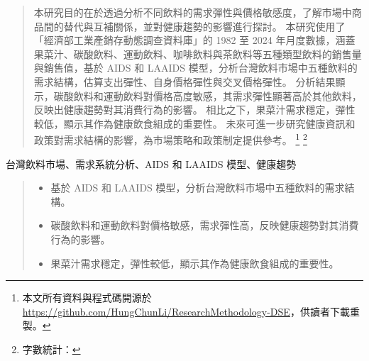 \begin{abstract}
    本研究目的在於透過分析不同飲料的需求彈性與價格敏感度，了解市場中商品間的替代與互補關係，並對健康趨勢的影響進行探討。
    本研究使用了「經濟部工業產銷存動態調查資料庫」的 1982 至 2024 年月度數據，涵蓋果菜汁、碳酸飲料、運動飲料、咖啡飲料與茶飲料等五種類型飲料的銷售量與銷售值，基於 AIDS 和 LAAIDS 模型，分析台灣飲料市場中五種飲料的需求結構，估算支出彈性、自身價格彈性與交叉價格彈性。
    分析結果顯示，碳酸飲料和運動飲料對價格高度敏感，其需求彈性顯著高於其他飲料，反映出健康趨勢對其消費行為的影響。
    相比之下，果菜汁需求穩定，彈性較低，顯示其作為健康飲食組成的重要性。
    未來可進一步研究健康資訊和政策對需求結構的影響，為市場策略和政策制定提供參考。
    \footnote{本文所有資料與程式碼開源於 \url{https://github.com/HungChunLi/ResearchMethodology-DSE}，供讀者下載重製。}
    \footnote{字數統計：}
\end{abstract}
\vspace{-0.7cm}
\begin{keywords}
    台灣飲料市場、需求系統分析、AIDS 和 LAAIDS 模型、健康趨勢
\end{keywords}
\vspace{-0.7cm}
\renewcommand{\abstractname}{文章重點} %
\begin{abstract}
    \vspace{-7ex} %
    \noindent 
    \begin{itemize}
        \item[1] 基於 AIDS 和 LAAIDS 模型，分析台灣飲料市場中五種飲料的需求結構。
        \item[2] 碳酸飲料和運動飲料對價格敏感，需求彈性高，反映健康趨勢對其消費行為的影響。
        \item[3] 果菜汁需求穩定，彈性較低，顯示其作為健康飲食組成的重要性。 
    \end{itemize}
\end{abstract}